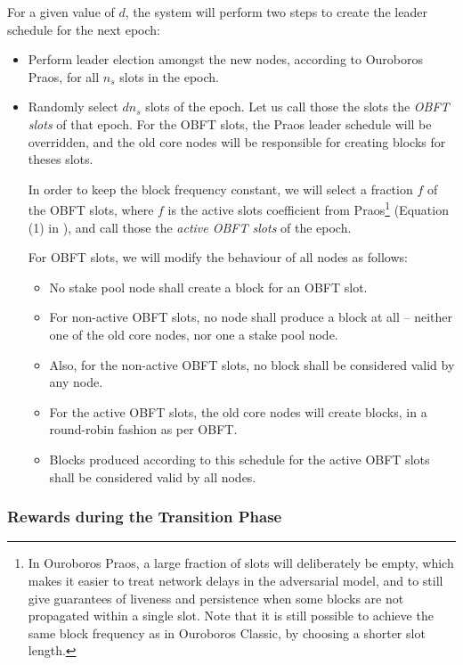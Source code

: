 \documentclass[11pt,a4paper,dvipsnames,twosided]{article}
\begin{document}
For a given value of \(d\), the system will perform two steps to create the
leader schedule for the next epoch:
\begin{itemize}
\item Perform leader election amongst the new nodes, according to Ouroboros
  Praos, for all \(n_s\) slots in the epoch.
\item Randomly select \(d n_s\) slots of the epoch. Let us call those the slots
  the \emph{OBFT slots} of that epoch. For the OBFT slots, the Praos leader
  schedule will be overridden, and the old core nodes will be responsible for
  creating blocks for theses slots.

  In order to keep the block frequency constant, we will select a fraction
  \(f\) of the OBFT slots, where \(f\) is the active slots coefficient from
  Praos\footnote{In Ouroboros Praos, a large fraction of slots will deliberately
  be empty, which makes it easier to treat network delays in the adversarial
  model, and to still give guarantees of liveness and persistence when some
  blocks are not propagated within a single slot. Note that it is still possible
  to achieve the same block frequency as in Ouroboros Classic, by choosing a
  shorter slot length.} (Equation (1) in \citep{ouroboros_praos}), and call
  those the \emph{active OBFT slots} of the epoch.

  For OBFT slots, we will modify the behaviour of all nodes as follows:
  \begin{itemize}
  \item
    No stake pool node shall create a block for an OBFT slot.
  \item
    For non-active OBFT slots, no node shall produce a block at all -- neither
    one of the old core nodes, nor one a stake pool node.
  \item
    Also, for the non-active OBFT slots, no block shall be considered valid by
    any node.
  \item For the active OBFT slots, the old core nodes will create blocks, in a
    round-robin fashion as per OBFT.
  \item
    Blocks produced according to this schedule for the active OBFT slots shall
    be considered valid by all nodes.
  \end{itemize}
\end{itemize}

\subsubsection{Rewards during the Transition Phase}
\label{rewards-during-the-transition-phase}
\end{document}
